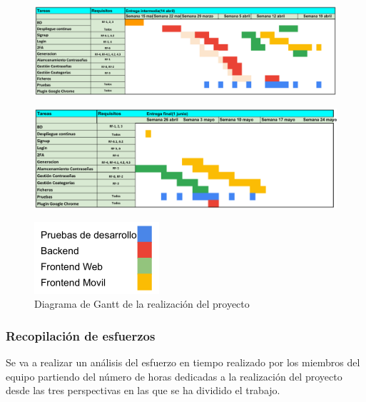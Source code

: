 \documentclass{article}
\begin{document}
\begin{landscape}
   \begin{figure}[H]
       \centering
       \includegraphics[width=1.2\textheight]{../images/diag-gantt-1-nuevo.png}
       \label{gantt-1-n}
   \end{figure}

   \begin{figure}[H]
       \centering
       \includegraphics[width=1\textheight]{../images/diag-gantt-2-nuevo.png}
       \label{gantt-2-n}
      \end{figure}

      \begin{figure}[H]
         \centering
         \includegraphics[width=0.2\textheight]{../images/diag-gantt-3-nuevo.png}
         \caption{Diagrama de Gantt de la realización del proyecto}
         \label{gantt-3-n}
  \end{figure}
\end{landscape}
\pagebreak

\subsubsection*{Recopilación de esfuerzos}

Se va a realizar un análisis del esfuerzo en tiempo realizado por los miembros del equipo partiendo del número de horas dedicadas a la realización del proyecto desde las tres perspectivas en las que se ha dividido el trabajo.
\end{document}
